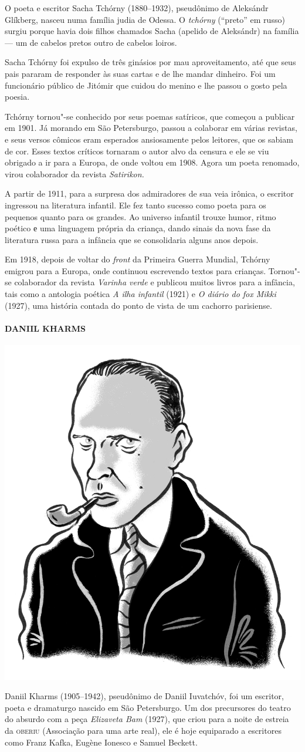 \noindent{}O poeta e escritor Sacha Tchórny (1880--1932), pseudônimo de Aleksándr
Glíkberg, nasceu numa família judia de Odessa. O \emph{tchórny}
(``preto'' em russo) surgiu porque havia dois filhos chamados Sacha
(apelido de Aleksándr) na família --- um de cabelos pretos outro de
cabelos loiros.

Sacha Tchórny foi expulso de três ginásios por mau aproveitamento, até
que seus pais pararam de responder às suas cartas e de lhe mandar
dinheiro. Foi um funcionário público de Jitómir que cuidou do menino e
lhe passou o gosto pela poesia.

Tchórny tornou"-se conhecido por seus poemas satíricos, que começou a
publicar em 1901. Já morando em São Petersburgo, passou a colaborar em
várias revistas, e seus versos cômicos eram esperados ansiosamente pelos
leitores, que os sabiam de cor. Esses textos críticos tornaram o autor
alvo da censura e ele se viu obrigado a ir para a Europa, de onde voltou
em 1908. Agora um poeta renomado, virou colaborador da revista
\emph{Satirikon.}

A partir de 1911, para a surpresa dos admiradores de sua veia irônica, o
escritor ingressou na literatura infantil. Ele fez tanto sucesso como
poeta para os pequenos quanto para os grandes. Ao universo infantil
trouxe humor, ritmo poético е uma linguagem própria da criança, dando
sinais da nova fase da literatura russa para a infância que se
consolidaria alguns anos depois.

Em 1918, depois de voltar do \emph{front} da Primeira Guerra Mundial,
Tchórny emigrou para a Europa, onde continuou escrevendo textos para
crianças. Tornou"-se colaborador da revista \emph{Varinha verde} e
publicou muitos livros para a infância, tais como a antologia poética
\emph{A ilha infantil} (1921) e \emph{O diário do fox Mikki}
(1927), uma história contada do ponto de vista de um cachorro
parisiense.

\paragraph{DANIIL KHARMS}

\noindent\includegraphics[width=.8in]{./imgs/autor12.jpg}

\noindent{}Daniil Kharms (1905--1942), pseudônimo de Daniil Iuvatchóv, foi um
escritor, poeta e dramaturgo nascido em São Petersburgo. Um dos
precursores do teatro do absurdo com a peça \emph{Elizaveta Bam} (1927),
que criou para a noite de estreia da \textsc{oberiu} (Associação para uma arte
real), ele é hoje equiparado a escritores como Franz Kafka, Eugène
Ionesco e Samuel Beckett.

